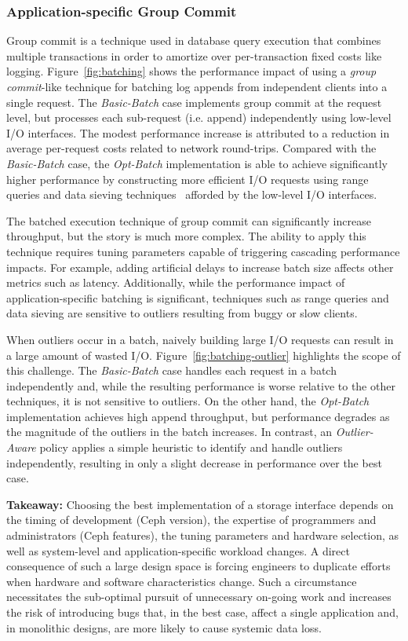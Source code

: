 \subsubsection{Application-specific Group Commit}
\label{sec:batch}

Group commit is a technique used in database query execution that combines
multiple transactions in order to amortize over per-transaction fixed costs
like logging. Figure~\ref{fig:batching} shows the performance impact of using
a \emph{group commit}-like technique for batching log appends from independent
clients into a single request. The \emph{Basic-Batch} case implements group
commit at the request level, but processes each sub-request (i.e. append)
independently using low-level I/O interfaces. The modest performance increase
is attributed to a reduction in average per-request costs related to network
round-trips. Compared with the \emph{Basic-Batch} case, the \emph{Opt-Batch}
implementation is able to achieve significantly higher performance by
constructing more efficient I/O requests using range queries and data sieving
techniques~\cite{x} afforded by the low-level I/O interfaces.

The batched execution technique of group commit can significantly increase
throughput, but the story is much more complex. The ability to apply this
technique requires tuning parameters capable of triggering cascading performance impacts.
For example, adding artificial delays to increase batch size affects other metrics such as latency.
Additionally, while the performance impact of application-specific batching is significant,
techniques such as range queries and data sieving are sensitive to outliers
resulting from buggy or slow clients.

When outliers occur in a batch, naively building large I/O requests can result
in a large amount of wasted I/O. Figure~\ref{fig:batching-outlier} highlights
the scope of this challenge. The \emph{Basic-Batch} case handles each request
in a batch independently and, while the resulting performance is worse relative to the
other techniques, it is not sensitive to outliers. On the other hand, the \emph{Opt-Batch}
implementation achieves high append throughput, but performance degrades as
the magnitude of the outliers in the batch increases. In contrast, an
\emph{Outlier-Aware} policy applies a simple heuristic to identify and handle outliers 
independently, resulting in only a slight decrease in
performance over the best case.

\textbf{Takeaway:} Choosing the best implementation of a storage interface
depends on the timing of development (Ceph version), the expertise of
programmers and administrators (Ceph features), the tuning parameters and hardware
selection, as well as system-level and application-specific workload changes.
A direct consequence of such a large design space is forcing engineers
to duplicate efforts when hardware and software characteristics change. Such a 
circumstance necessitates the sub-optimal pursuit of unnecessary on-going work 
and increases the risk of introducing bugs that, in the best case, affect a single application and, in monolithic
designs, are more likely to cause systemic data loss.

